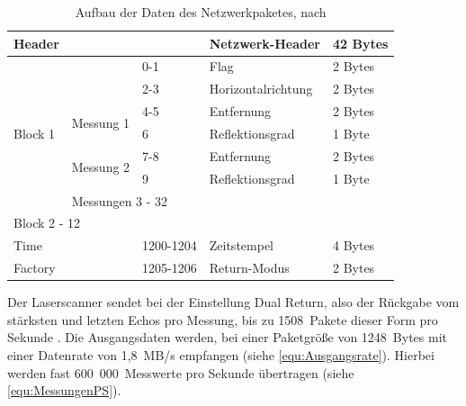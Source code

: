\documentclass[a4paper,12pt,bibliography=totoc, listof=totoc,titlepage,pointlessnumbers]{scrreprt}
\begin{document}
\begin{table}[!ht]
\centering
\begin{tabular}{|lll|l|l|}
\hline
Header                                         &                                 
                &           & Netzwerk-Header  & 42 Bytes \\ \hline
\multicolumn{1}{|l|}{\multirow{7}{*}{Block 1}} &                                 
                & 0-1       & Flag             & 2 Bytes  \\ \cline{2-5} 
\multicolumn{1}{|l|}{}                         &                                 
                & 2-3       & Horizontalrichtung & 2 Bytes  \\ \cline{2-5} 
\multicolumn{1}{|l|}{}                         & 
\multicolumn{1}{l|}{\multirow{2}{*}{Messung 1}} & 4-5       & Entfernung       & 
2 Bytes  \\ \cline{3-5} 
\multicolumn{1}{|l|}{}                         & \multicolumn{1}{l|}{}           
                & 6         & Reflektionsgrad    & 1 Byte   \\ \cline{2-5} 
\multicolumn{1}{|l|}{}                         & 
\multicolumn{1}{l|}{\multirow{2}{*}{Messung 2}} & 7-8       & Entfernung       & 
2 Bytes  \\ \cline{3-5} 
\multicolumn{1}{|l|}{}                         & \multicolumn{1}{l|}{}           
                & 9         & Reflektionsgrad     & 1 Byte   \\ \cline{2-5} 
\multicolumn{1}{|l|}{}                         & \multicolumn{4}{l|}{Messungen 3 
- 32}                                                     \\ \hline
\multicolumn{5}{|l|}{Block 2 - 12}                                               
                                                          \\ \hline
Time                                           & \multicolumn{1}{l|}{}           
                & 1200-1204 & Zeitstempel      & 4 Bytes  \\ \hline
Factory                                        & \multicolumn{1}{l|}{}           
                & 1205-1206 & Return-Modus     & 2 Bytes  \\ \hline
\end{tabular}

\caption{Aufbau der Daten des Netzwerkpaketes, nach \citet[S. 12]{vlpManual}}
\label{tab:datenmodell}
\end{table}

Der Laser\-scan\-ner sendet bei der Einstellung Dual Return, also der Rückgabe vom stärksten und letzten Echos pro Messung, 
bis zu 1508~Pakete dieser Form pro Sekunde \citep[S. 49]{vlpManual}. Die Ausgangsdaten werden, bei einer Paketgröße von 1248~Bytes mit einer Datenrate von 1,8~MB/s empfangen (siehe \autoref{equ:Ausgangsrate}). Hierbei werden fast 600~000~Messwerte pro Sekunde übertragen (siehe \autoref{equ:MessungenPS}).
\end{document}

